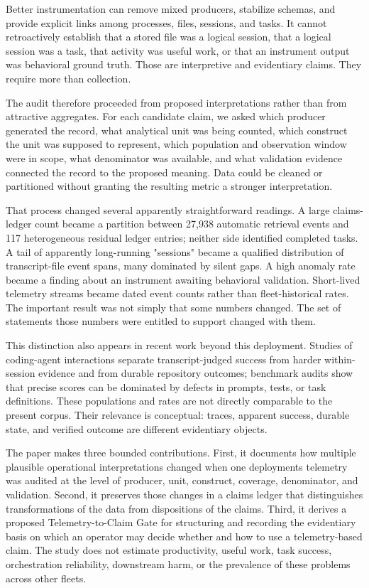 \documentclass[12pt]{article}
\begin{document}
Better instrumentation can remove mixed producers, stabilize schemas, and provide explicit links among processes, files, sessions, and tasks. It cannot retroactively establish that a stored file was a logical session, that a logical session was a task, that activity was useful work, or that an instrument output was behavioral ground truth. Those are interpretive and evidentiary claims. They require more than collection.

The audit therefore proceeded from proposed interpretations rather than from attractive aggregates. For each candidate claim, we asked which producer generated the record, what analytical unit was being counted, which construct the unit was supposed to represent, which population and observation window were in scope, what denominator was available, and what validation evidence connected the record to the proposed meaning. Data could be cleaned or partitioned without granting the resulting metric a stronger interpretation.

That process changed several apparently straightforward readings. A large claims-ledger count became a partition between 27,938 automatic retrieval events and 117 heterogeneous residual ledger entries; neither side identified completed tasks. A tail of apparently long-running "sessions" became a qualified distribution of transcript-file event spans, many dominated by silent gaps. A high anomaly rate became a finding about an instrument awaiting behavioral validation. Short-lived telemetry streams became dated event counts rather than fleet-historical rates. The important result was not simply that some numbers changed. The set of statements those numbers were entitled to support changed with them.

This distinction also appears in recent work beyond this deployment. Studies of coding-agent interactions separate transcript-judged success from harder within-session evidence and from durable repository outcomes; benchmark audits show that precise scores can be dominated by defects in prompts, tests, or task definitions. These populations and rates are not directly comparable to the present corpus. Their relevance is conceptual: traces, apparent success, durable state, and verified outcome are different evidentiary objects.

The paper makes three bounded contributions. First, it documents how multiple plausible operational interpretations changed when one deployment\textquotesingle s telemetry was audited at the level of producer, unit, construct, coverage, denominator, and validation. Second, it preserves those changes in a claims ledger that distinguishes transformations of the data from dispositions of the claims. Third, it derives a proposed Telemetry-to-Claim Gate for structuring and recording the evidentiary basis on which an operator may decide whether and how to use a telemetry-based claim. The study does not estimate productivity, useful work, task success, orchestration reliability, downstream harm, or the prevalence of these problems across other fleets.
\end{document}
